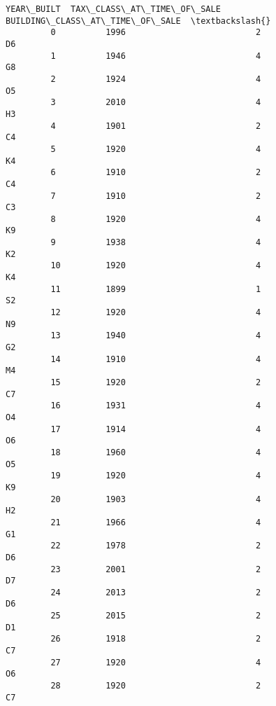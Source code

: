 \documentclass[11pt]{article}
\begin{document}
\begin{Verbatim}[commandchars=\\\{\}]
              YEAR\_BUILT  TAX\_CLASS\_AT\_TIME\_OF\_SALE  BUILDING\_CLASS\_AT\_TIME\_OF\_SALE  \textbackslash{}
         0          1996                          2                              D6   
         1          1946                          4                              G8   
         2          1924                          4                              O5   
         3          2010                          4                              H3   
         4          1901                          2                              C4   
         5          1920                          4                              K4   
         6          1910                          2                              C4   
         7          1910                          2                              C3   
         8          1920                          4                              K9   
         9          1938                          4                              K2   
         10         1920                          4                              K4   
         11         1899                          1                              S2   
         12         1920                          4                              N9   
         13         1940                          4                              G2   
         14         1910                          4                              M4   
         15         1920                          2                              C7   
         16         1931                          4                              O4   
         17         1914                          4                              O6   
         18         1960                          4                              O5   
         19         1920                          4                              K9   
         20         1903                          4                              H2   
         21         1966                          4                              G1   
         22         1978                          2                              D6   
         23         2001                          2                              D7   
         24         2013                          2                              D6   
         25         2015                          2                              D1   
         26         1918                          2                              C7   
         27         1920                          4                              O6   
         28         1920                          2                              C7   

\end{Verbatim}
\end{document}
